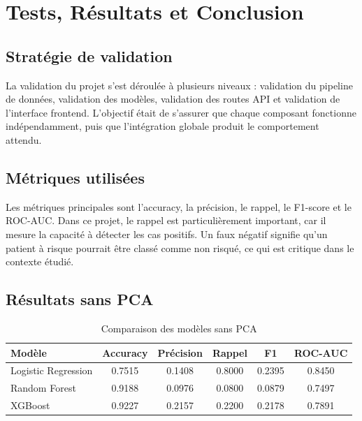 \documentclass[12pt,a4paper]{report}
\begin{document}
\chapter{Tests, Résultats et Conclusion}

\section{Stratégie de validation}
La validation du projet s'est déroulée à plusieurs niveaux : validation du pipeline de données, validation des modèles, validation des routes API et validation de l'interface frontend. L'objectif était de s'assurer que chaque composant fonctionne indépendamment, puis que l'intégration globale produit le comportement attendu.

\section{Métriques utilisées}
Les métriques principales sont l'accuracy, la précision, le rappel, le F1-score et le ROC-AUC. Dans ce projet, le rappel est particulièrement important, car il mesure la capacité à détecter les cas positifs. Un faux négatif signifie qu'un patient à risque pourrait être classé comme non risqué, ce qui est critique dans le contexte étudié.

\section{Résultats sans PCA}
\begin{table}[H]
\centering
\caption{Comparaison des modèles sans PCA}
\begin{tabular}{lccccc}
\toprule
\textbf{Modèle} & \textbf{Accuracy} & \textbf{Précision} & \textbf{Rappel} & \textbf{F1} & \textbf{ROC-AUC}\\
\midrule
Logistic Regression & 0.7515 & 0.1408 & 0.8000 & 0.2395 & 0.8450\\
Random Forest & 0.9188 & 0.0976 & 0.0800 & 0.0879 & 0.7497\\
XGBoost & 0.9227 & 0.2157 & 0.2200 & 0.2178 & 0.7891\\
\bottomrule
\end{tabular}
\end{table}
\end{document}

